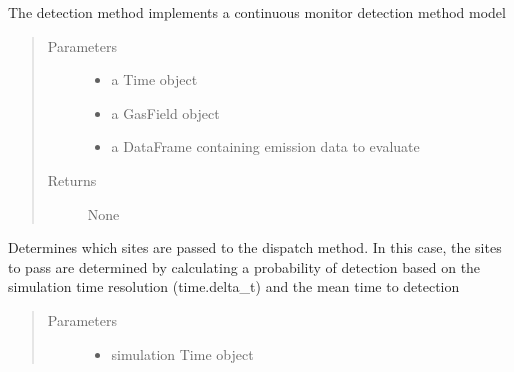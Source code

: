 \documentclass[letterpaper,10pt,english]{sphinxmanual}
\begin{document}
\begin{fulllineitems}

\begin{fulllineitems}
\label{\detokenize{index:feast.DetectionModules.site_monitor.SiteMonitor.detect}}
The detection method implements a continuous monitor detection method model
\begin{quote}\begin{description}
\item[{Parameters}] \leavevmode\begin{itemize}
\item {} 
 \textendash{} a Time object

\item {} 
 \textendash{} a GasField object

\item {} 
 \textendash{} a DataFrame containing emission data to evaluate

\end{itemize}

\item[{Returns}] \leavevmode
None

\end{description}\end{quote}

\end{fulllineitems}


\begin{fulllineitems}
\label{\detokenize{index:feast.DetectionModules.site_monitor.SiteMonitor.detect_prob_curve}}
Determines which sites are passed to the dispatch method.
In this case, the sites to pass are determined by calculating a probability of detection based on the
simulation time resolution (time.delta\_t) and the mean time to detection
\begin{quote}\begin{description}
\item[{Parameters}] \leavevmode\begin{itemize}
\item {} 
 \textendash{} simulation Time object


\end{itemize}
\end{description}
\end{quote}
\end{fulllineitems}
\end{fulllineitems}
\end{document}
